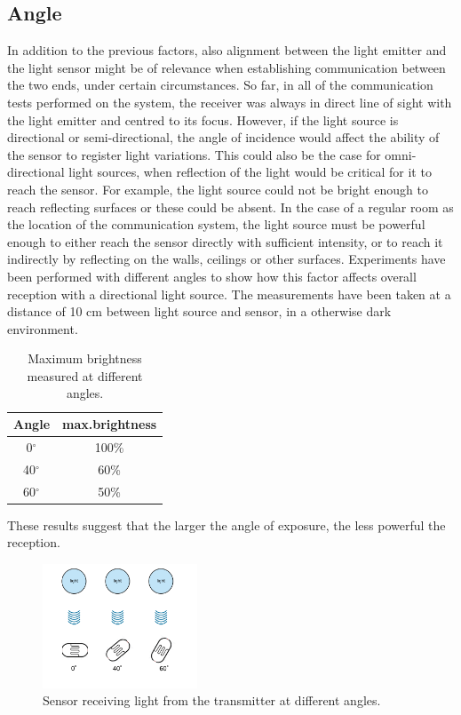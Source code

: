 \subsection{Angle}
In addition to the previous factors, also alignment between the light emitter and the light sensor might be of relevance when establishing communication between the two ends, under certain circumstances.
So far, in all of the communication tests performed on the system, the receiver was always in direct line of sight with the light emitter and centred to its focus.
However,  if the light source is directional or semi-directional, the angle of incidence would affect the ability of the sensor to register light variations.
This could also be the case for omni-directional light sources, when reflection of the light would be critical for it to reach the sensor.
For example, the light source could not be bright enough to reach reflecting surfaces or these could be absent.
In the case of a regular room as the location of the communication system,  the light source must be powerful enough to either reach the sensor directly with sufficient intensity, or to reach it indirectly by reflecting on the walls, ceilings or other surfaces.
Experiments have been performed with different angles to show how this factor affects overall reception with a directional light source.
The measurements have been taken at a distance of 10 cm between light source and sensor, in a otherwise dark environment.
\begin{table}[hbt]
\centering
  \begin{tabular}{c c}
    Angle & max.brightness \\
    \hline
    0$^{\circ}$ & 100\% \\
    40$^{\circ}$ & 60\% \\
    60$^{\circ}$ & 50\% 
  \end{tabular}
  \caption{Maximum brightness measured at different angles.}
  \label{tab:anglesphy}
\end{table}
These results suggest that the larger the angle of exposure, the less powerful the reception. 

\begin{figure}[hbt]
\centering
  \includegraphics[height=140px]{img/angles}
  \caption{Sensor receiving light from the transmitter at different angles.}
  \label{fig:angles}
\end{figure}


